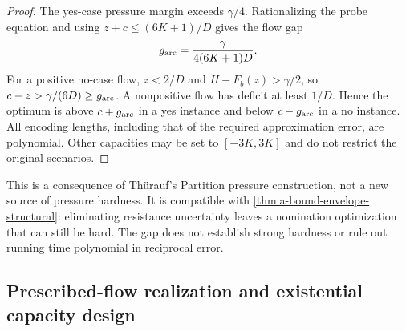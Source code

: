 \begin{proof}
The yes-case pressure margin exceeds $\gamma/4$. Rationalizing the
probe equation and using $z+c\le(6K+1)/D$ gives the flow gap
\[
 g_{\rm arc}=\frac{\gamma}{4(6K+1)D}.
\]
For a positive no-case flow, $z<2/D$ and $H-F_b(z)>\gamma/2$, so
$c-z>\gamma/(6D)\ge g_{\rm arc}$. A nonpositive flow has deficit
at least $1/D$. Hence the optimum is above $c+g_{\rm arc}$ in a yes
instance and below $c-g_{\rm arc}$ in a no instance. All encoding
lengths, including that of the required approximation error, are
polynomial. Other capacities may be set to $[-3K,3K]$ and do not
restrict the original scenarios.
\end{proof}

This is a consequence of Th\"urauf's Partition pressure construction,
not a new source of pressure hardness. It is compatible with
\cref{thm:a-bound-envelope-structural}: eliminating resistance uncertainty
leaves a nomination optimization that can still be hard. The gap does
not establish strong hardness or rule out running time polynomial in
reciprocal error.

\subsection{Prescribed-flow realization and existential capacity design}
\label{subsec:a-bound-realization}

